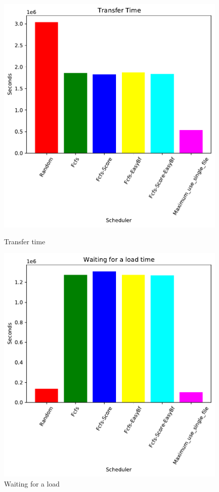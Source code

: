 	\begin{figure}[H] 
	\begin{minipage}[b]{0.5\linewidth}\centering\includegraphics[width=1\linewidth]{MBSS/plot/2022-03-16_Transfer_time450_128_32_256_4_1024.pdf}\caption{Transfer time}\vspace{4ex}\end{minipage}
	\begin{minipage}[b]{0.5\linewidth}\centering\includegraphics[width=1\linewidth]{MBSS/plot/2022-03-16_Waiting_for_a_load_time450_128_32_256_4_1024.pdf}\caption{Waiting for a load}\vspace{4ex}\end{minipage} 

\end{figure}

